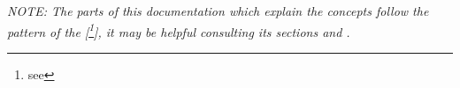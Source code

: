 {\em 
  NOTE: The parts of this documentation which explain the concepts
   follow the pattern of the 
  [\footnote{see {\tt \STLURL}}]{\STLURL},
  it may be helpful consulting its sections
  and
  .
}
